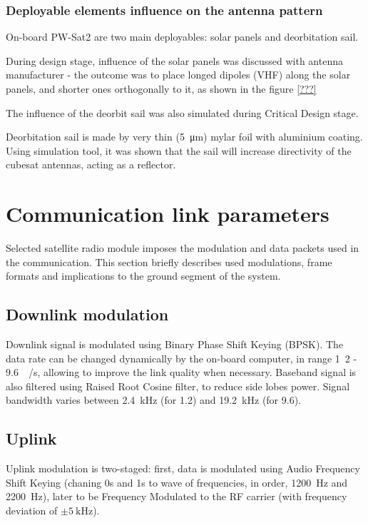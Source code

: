 \subsection{Deployable elements influence on the antenna pattern}

On-board PW-Sat2 are two main deployables: solar panels and deorbitation sail.

During design stage, influence of the solar panels was discussed with antenna manufacturer - the outcome was to place longed dipoles (VHF) along the solar panels, and shorter ones orthogonally to it, as shown in the figure \ref{???}


The influence of the deorbit sail was also simulated during Critical Design stage.

Deorbitation sail is made by very thin (\SI{5}{\micro\meter}) mylar foil with aluminium coating. Using %
simulation tool, it was shown that the sail will increase directivity of the cubesat antennas, acting as a reflector.


\chapter{Communication link parameters}
Selected satellite radio module imposes the modulation and data packets used in the communication. This section briefly describes used modulations, frame formats and implications to the ground segment of the system.

\section{Downlink modulation}
Downlink signal is modulated using Binary Phase Shift Keying (BPSK). The data rate can be changed dynamically by the on-board computer, in range \si{1.2} - \SI{9.6}{\kilo\bit / \second}, allowing to improve the link quality when necessary. Baseband signal is also filtered using Raised Root Cosine filter, to reduce side lobes power. Signal bandwidth varies between \SI{2.4}{\kHz} (for \SI{1.2}{\kbps}) and \SI{19.2}{\kHz} (for \SI{9.6}{\kbps}). 


\section{Uplink}
Uplink modulation is two-staged: first, data is modulated using Audio Frequency Shift Keying (chaning 0s and 1s to wave of frequencies, in order, \SI{1200}{\hertz} and \SI{2200}{\hertz}), later to be Frequency Modulated to the RF carrier (with frequency deviation of $\pm\SI{5}{\kilo\hertz}$).

